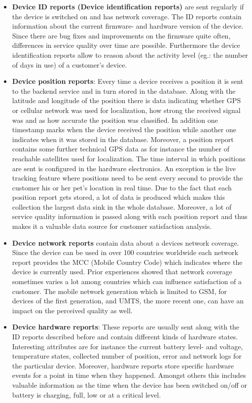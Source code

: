 \begin{itemize}
	\item \textbf{Device ID reports (Device identification reports)} are sent regularly if the device is switched on and has network coverage. The ID reports contain information about the current firmware- and hardware version of the device. Since there are bug fixes and improvements on the firmware quite often, differences in service quality over time are possible. Furthermore the device identification reports allow to reason about the activity level (eg.: the number of days in use) of a customer's device.
	\item \textbf{Device position reports}: Every time a device receives a position it is sent to the backend service and in turn stored in the database. Along with the latitude and longitude of the position there is data indicating whether GPS or cellular network was used for localization, how strong the received signal was and as how accurate the position was classified. In addition one timestamp marks when the device received the position while another one indicates when it was stored in the database. Moreover, a position report contains some further technical GPS data as for instance the number of reachable satellites used for localization. The time interval in which positions are sent is configured in the hardware electronics. An exception is the live tracking feature where positions need to be sent every second to provide the customer his or her pet's location in real time. Due to the fact that each position report gets stored, a lot of data is produced which makes this collection the largest data sink in the whole database. Moreover, a lot of service quality information is passed along with each position report and thus makes it a valuable data source for customer satisfaction analysis. 
	\item \textbf{Device network reports} contain data about a devices network coverage. Since the device can be used in over 100 countries worldwide each network report provides the MCC (Mobile Country Code) which indicates where the device is currently used. Prior experiences showed that network coverage sometimes varies a lot among countries which can influence satisfaction of a customer. The mobile network generation which is limited to GSM, for devices of the first generation, and UMTS, the more recent one, can have an impact on the perceived quality as well.
	\item \textbf{Device hardware reports}: These reports are usually sent along with the ID reports described before and contain different kinds of hardware states. Interesting attributes are for instance the current battery level- and voltage, temperature states, collected number of position, error and network logs for the particular device. Moreover, hardware reports store specific hardware events for a point in time when they happened. Amongst others this includes valuable information as the time when the device has been switched on/off or battery is charging, full, low or at a critical level. 

\end{itemize}
